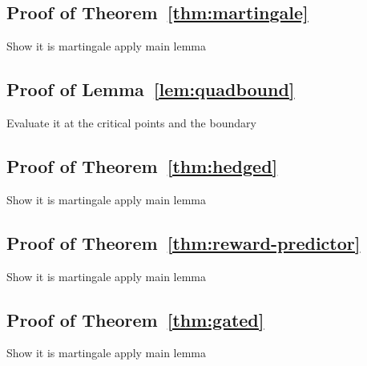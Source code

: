 \subsection{Proof of Theorem~\ref{thm:martingale}}
Show it is martingale apply main lemma
\subsection{Proof of Lemma~\ref{lem:quadbound}}
Evaluate it at the critical points and the boundary
\subsection{Proof of Theorem~\ref{thm:hedged}}
Show it is martingale apply main lemma
\subsection{Proof of Theorem~\ref{thm:reward-predictor}}
Show it is martingale apply main lemma
\subsection{Proof of Theorem~\ref{thm:gated}}
Show it is martingale apply main lemma

